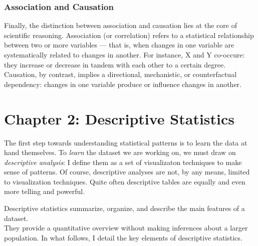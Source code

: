 \documentclass[
  letterpaper,
  DIV=11,
  numbers=noendperiod]{scrreprt}
\begin{document}
\subsection{Association and Causation}\label{association-and-causation}

Finally, the distinction between association and causation lies at the
core of scientific reasoning. Association (or correlation) refers to a
statistical relationship between two or more variables --- that is, when
changes in one variable are systematically related to changes in
another. For instance, X and Y co-occure: they increase or decrease in
tandem with each other to a certain degree. Causation, by contrast,
implies a directional, mechanistic, or counterfactual dependency:
changes in one variable produce or influence changes in another.


\chapter{Chapter 2: Descriptive
Statistics}\label{chapter-2-descriptive-statistics}

The first step towards understanding statistical patterns is to learn
the data at hand themselves. To \emph{learn} the dataset we are working
on, we must draw on \emph{descriptive analysis}: I define them as a set
of visualizaton techniques to make sense of patterns. Of course,
descriptive analyses are not, by any means, limited to visualization
techniques. Quite often descriptive tables are equally and even more
telling and powerful.

Descriptive statistics summarize, organize, and describe the main
features of a dataset.\\
They provide a quantitative overview without making inferences about a
larger population. In what follows, I detail the key elements of
descriptive statistics.
\end{document}
